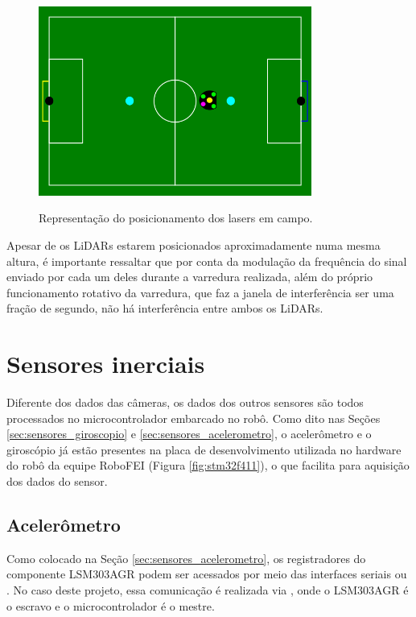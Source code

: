 \documentclass[acronym, symbols, table, deposito]{fei}
\begin{document}
	\begin{figure}[!htb]
		\centering
		\caption{Representação do posicionamento dos lasers em campo.}
		\includegraphics[width=0.80\textwidth]{representacao_teste_lidar_cameras.png}
		\label{fig:representacao_teste_lidar}
	\end{figure}

	Apesar de os LiDARs estarem posicionados aproximadamente numa mesma altura, é importante ressaltar que por conta da modulação da frequência do sinal enviado por cada um deles durante a varredura realizada, além do próprio funcionamento rotativo da varredura, que faz a janela de interferência ser uma fração de segundo, não há interferência entre ambos os LiDARs.
	
	\section{Sensores inerciais}
	
	Diferente dos dados das câmeras, os dados dos outros sensores são todos processados no microcontrolador embarcado no robô. Como dito nas Seções \ref{sec:sensores_giroscopio} e \ref{sec:sensores_acelerometro}, o acelerômetro e o giroscópio já estão presentes na placa de desenvolvimento utilizada no hardware do robô da equipe RoboFEI (Figura \ref{fig:stm32f411}), o que facilita para aquisição dos dados do sensor.
	
	\subsection{Acelerômetro}
	
	Como colocado na Seção \ref{sec:sensores_acelerometro}, os registradores do componente LSM303AGR podem ser acessados por meio das interfaces seriais  ou . No caso deste projeto, essa comunicação é realizada via , onde o LSM303AGR é o escravo e o microcontrolador é o mestre.
	
\end{document}

